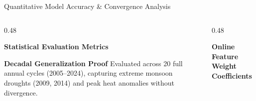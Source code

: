 \documentclass[aspectratio=169,10pt]{beamer}
\begin{document}
\begin{frame}{Quantitative Model Accuracy \& Convergence Analysis}
    \begin{columns}[T]
        \begin{column}{0.48\textwidth}
            \begin{block}{\textbf{Statistical Evaluation Metrics}}
                \centering
            \end{block}
            \vspace{0.15cm}
            \begin{block}{\textbf{Decadal Generalization Proof}}
                \scriptsize
                Evaluated across 20 full annual cycles (2005--2024), capturing extreme monsoon droughts (2009, 2014) and peak heat anomalies without divergence.
            \end{block}
        \end{column}
        \begin{column}{0.48\textwidth}
            \begin{exampleblock}{\textbf{Online Feature Weight Coefficients}}
                \centering
\end{exampleblock}
\end{column}
\end{columns}
\end{frame}
\end{document}
